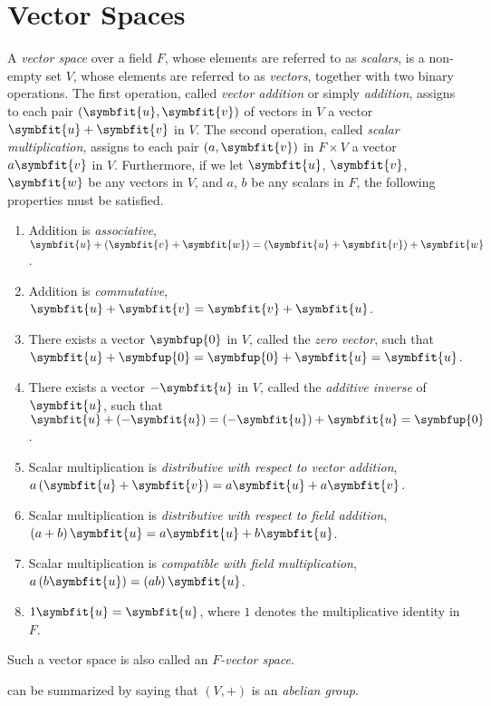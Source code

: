\chapter{Vector Spaces}

\begin{definition}
    A \emph{vector space} over a field \(F\), whose elements are referred to as \emph{scalars}, is a non-empty set \(V\), whose elements are referred to as \emph{vectors}, together with two binary operations. The first operation, called \emph{vector addition} or simply \emph{addition}, assigns to each pair \(\left(\symbfit{u},\symbfit{v}\right)\) of vectors in \(V\) a vector \(\symbfit{u}+\symbfit{v}\) in \(V\). The second operation, called \emph{scalar multiplication}, assigns to each pair \(\left(a,\symbfit{v}\right)\) in \(F\times V\) a vector \(a\symbfit{v}\) in \(V\). Furthermore, if we let \(\symbfit{u}\), \(\symbfit{v}\), \(\symbfit{w}\) be any vectors in \(V\), and \(a\), \(b\) be any scalars in \(F\), the following properties must be satisfied.
    \begin{enumerate}
        \item\label{Item.1} Addition is \emph{associative}, \(\symbfit{u}+\left(\symbfit{v}+\symbfit{w}\right)=\left(\symbfit{u}+\symbfit{v}\right)+\symbfit{w}\).
        \item\label{Item.2} Addition is \emph{commutative}, \(\symbfit{u}+\symbfit{v}=\symbfit{v}+\symbfit{u}\).
        \item\label{Item.3} There exists a vector \(\symbfup{0}\) in \(V\), called the \emph{zero vector}, such that \(\symbfit{u}+\symbfup{0}=\symbfup{0}+\symbfit{u}=\symbfit{u}\).
        \item\label{Item.4} There exists a vector \(-\symbfit{u}\) in \(V\), called the \emph{additive inverse} of \(\symbfit{u}\), such that \(\symbfit{u}+\left(-\symbfit{u}\right)=\left(-\symbfit{u}\right)+\symbfit{u}=\symbfup{0}\).
        \item Scalar multiplication is \emph{distributive with respect to vector addition}, \(a\left(\symbfit{u}+\symbfit{v}\right)=a\symbfit{u}+a\symbfit{v}\).
        \item Scalar multiplication is \emph{distributive with respect to field addition}, \(\left(a+b\right)\symbfit{u}=a\symbfit{u}+b\symbfit{u}\).
        \item Scalar multiplication is \emph{compatible with field multiplication}, \(a\left(b\symbfit{u}\right)=\left(ab\right)\symbfit{u}\).
        \item \(1\symbfit{u}=\symbfit{u}\), where \(1\) denotes the multiplicative identity in \(F\).
    \end{enumerate}
    Such a vector space is also called an \emph{\(F\)-vector space}.
\end{definition}

\begin{remark}
     can be summarized by saying that \(\left(V,+\right)\) is an \emph{abelian group}.
\end{remark}

